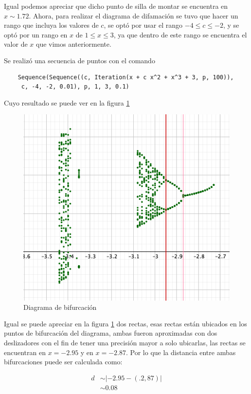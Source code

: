 \documentclass[11pt]{report}
\theoremstyle{plain}
\theoremstyle{definition}
\begin{document}
Igual podemos apreciar que dicho punto de silla de montar se encuentra en $x\sim 1.72$. Ahora, para realizar el diagrama de difamación se tuvo que hacer un rango que incluya los valores de $c$, se optó por usar el rango $-4\leq c \leq-2$, y se optó por un rango en $x$ de $1\leq x \leq 3$, ya que dentro de este rango se encuentra el valor de $x$ que vimos anteriormente.

Se realizó una secuencia de puntos con el comando
\begin{verbatim}
	Sequence(Sequence((c, Iteration(x + c x^2 + x^3 + 3, p, 100)),
	 c, -4, -2, 0.01), p, 1, 3, 0.1)
\end{verbatim}
Cuyo resultado se puede ver en la figura \ref{fig:Eje1_2}

\begin{figure}[!h] %
	\centering
	\includegraphics[scale=0.6]{caos_1_2.png}
	\caption{Diagrama de bifurcación}
	\label{fig:Eje1_2}
\end{figure}

Igual se puede apreciar en la figura \ref{fig:Eje1_2} dos rectas, esas rectas están ubicados en los puntos de bifurcación del diagrama, ambas fueron aproximadas con dos deslizadores con el fin de tener una precisión mayor a solo ubicarlas, las rectas se encuentran en $x=-2.95$ y en $x=-2.87$. Por lo que la distancia entre ambas bifurcaciones puede ser calculada como:

\begin{align*}
	d &\sim |-2.95-(.2,87)|\\
	&\sim 0.08
\end{align*}
\end{document}
